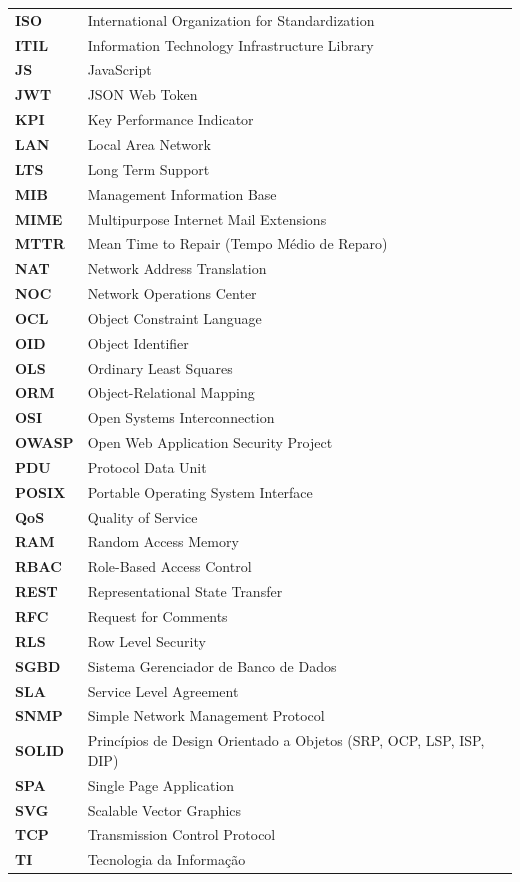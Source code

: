 \documentclass[12pt,a4paper]{article}
\begin{document}
\begin{longtable}{@{}>{\bfseries}p{2.2cm}p{11.5cm}@{}}
ISO & International Organization for Standardization \\
ITIL & Information Technology Infrastructure Library \\
JS & JavaScript \\
JWT & JSON Web Token \\
KPI & Key Performance Indicator \\
LAN & Local Area Network \\
LTS & Long Term Support \\
MIB & Management Information Base \\
MIME & Multipurpose Internet Mail Extensions \\
MTTR & Mean Time to Repair (Tempo Médio de Reparo) \\
NAT & Network Address Translation \\
NOC & Network Operations Center \\
OCL & Object Constraint Language \\
OID & Object Identifier \\
OLS & Ordinary Least Squares \\
ORM & Object-Relational Mapping \\
OSI & Open Systems Interconnection \\
OWASP & Open Web Application Security Project \\
PDU & Protocol Data Unit \\
POSIX & Portable Operating System Interface \\
QoS & Quality of Service \\
RAM & Random Access Memory \\
RBAC & Role-Based Access Control \\
REST & Representational State Transfer \\
RFC & Request for Comments \\
RLS & Row Level Security \\
SGBD & Sistema Gerenciador de Banco de Dados \\
SLA & Service Level Agreement \\
SNMP & Simple Network Management Protocol \\
SOLID & Princípios de Design Orientado a Objetos (SRP, OCP, LSP, ISP, DIP) \\
SPA & Single Page Application \\
SVG & Scalable Vector Graphics \\
TCP & Transmission Control Protocol \\
TI & Tecnologia da Informação \\

\end{longtable}
\end{document}
